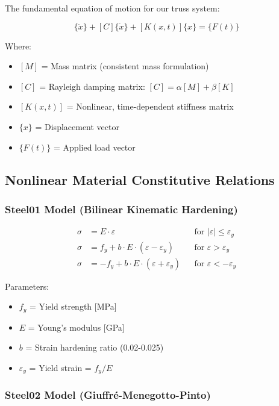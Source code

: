 \documentclass[12pt,a4paper]{article}
\begin{document}
The fundamental equation of motion for our truss system:

\begin{equation}
[M]\{\ddot{x}\} + [C]\{\dot{x}\} + [K(x,t)]\{x\} = \{F(t)\}
\end{equation}

Where:
\begin{itemize}
    \item $[M]$ = Mass matrix (consistent mass formulation)
    \item $[C]$ = Rayleigh damping matrix: $[C] = \alpha[M] + \beta[K]$
    \item $[K(x,t)]$ = Nonlinear, time-dependent stiffness matrix
    \item $\{x\}$ = Displacement vector
    \item $\{F(t)\}$ = Applied load vector
\end{itemize}

\subsection{Nonlinear Material Constitutive Relations}

\subsubsection{Steel01 Model (Bilinear Kinematic Hardening)}

\begin{align}
\sigma &= E \cdot \varepsilon && \text{for } |\varepsilon| \leq \varepsilon_y \\
\sigma &= f_y + b \cdot E \cdot (\varepsilon - \varepsilon_y) && \text{for } \varepsilon > \varepsilon_y \\
\sigma &= -f_y + b \cdot E \cdot (\varepsilon + \varepsilon_y) && \text{for } \varepsilon < -\varepsilon_y
\end{align}

Parameters:
\begin{itemize}
    \item $f_y$ = Yield strength [MPa]
    \item $E$ = Young's modulus [GPa]
    \item $b$ = Strain hardening ratio (0.02-0.025)
    \item $\varepsilon_y$ = Yield strain = $f_y/E$
\end{itemize}

\subsubsection{Steel02 Model (Giuffré-Menegotto-Pinto)}
\end{document}
